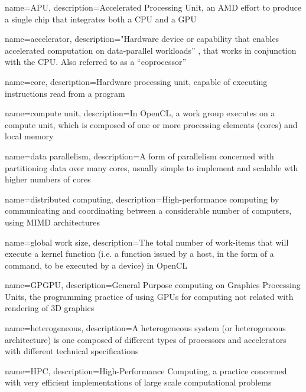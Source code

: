 {
    name=APU,
    description={Accelerated Processing Unit, an AMD effort to produce a single chip that integrates both a CPU and a GPU}
}

{
    name=accelerator,
    description={"Hardware device or capability that enables accelerated computation on data-parallel workloads'' \cite{Microsoft2013}, that works in conjunction with the CPU}. Also referred to as a ``coprocessor''
}


{
    name=core,
    description={Hardware processing unit, capable of executing instructions read from a program}
}

{
    name={compute unit},
    description={In OpenCL, a work group executes on a compute unit, which is composed of one or more processing elements (cores) and local memory}
}

{
    name={data parallelism},
    description={A form of parallelism concerned with partitioning data over many cores, usually simple to implement and scalable wth higher numbers of cores~\cite{tsuchiyama2010opencl}}
}

{
    name={distributed computing},
    description={High-performance computing by communicating and coordinating between a considerable number of computers, using MIMD architectures}
}

{
    name={global work size},
    description={The total number of work-items that will execute a kernel function (i.e. a function issued by a host, in the form of a command, to be executed by a device) in OpenCL}
}

{
    name={GPGPU},
    description={General Purpose computing on Graphics Processing Units, the programming practice of using GPUs for computing not related with rendering of 3D graphics}
}

{
    name={heterogeneous},
    description={A heterogeneous system (or heterogeneous architecture) is one composed of different types of processors and accelerators with different technical specifications}
}

{
    name={HPC},
    description={High-Performance Computing, a practice concerned with very efficient implementations of large scale computational problems}
}

